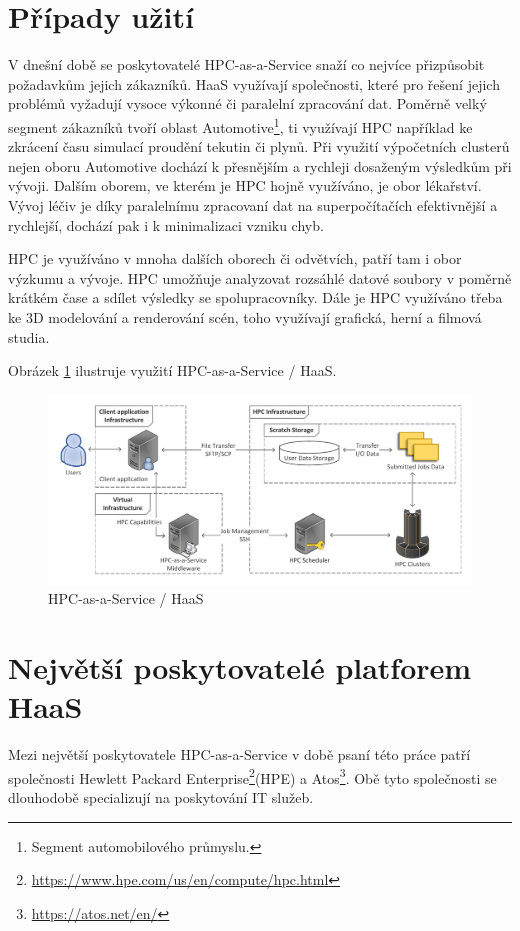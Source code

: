 \section{Případy užití}
V dnešní době se poskytovatelé HPC-as-a-Service snaží co nejvíce přizpůsobit požadavkům jejich zákazníků. HaaS využívají společnosti, které pro řešení jejich problémů vyžadují vysoce výkonné či paralelní zpracování dat. Poměrně velký segment zákazníků tvoří oblast Automotive\footnote{Segment automobilového průmyslu.}, ti využívají HPC například ke zkrácení času simulací proudění tekutin či plynů. Při využití výpočetních clusterů nejen oboru Automotive dochází k přesnějším a rychleji dosaženým výsledkům při vývoji. Dalším oborem, ve kterém je HPC hojně využíváno, je obor lékařství. Vývoj léčiv je díky paralelnímu zpracovaní dat na superpočítačích efektivnější a rychlejší, dochází pak i k minimalizaci vzniku chyb.

HPC je využíváno v mnoha dalších oborech či odvětvích, patří tam i obor výzkumu a vývoje. HPC umožňuje analyzovat rozsáhlé datové soubory v poměrně krátkém čase a sdílet výsledky se spolupracovníky. Dále je HPC využíváno třeba ke 3D modelování a renderování scén, toho využívají grafická, herní a filmová studia.

Obrázek \ref{fig:haas} ilustruje využití HPC-as-a-Service / HaaS.

\begin{figure}[!h]
	\centering
	\includegraphics[width=1\textwidth]{Figures/haas.pdf}
	\caption{HPC-as-a-Service / HaaS \cite{uG7wIvjQiIli6kO9}}
	\label{fig:haas}
\end{figure}

\section{Největší poskytovatelé platforem HaaS}
Mezi největší poskytovatele HPC-as-a-Service v době psaní této práce patří společnosti Hewlett Packard Enterprise\footnote{\href{https://www.hpe.com/us/en/compute/hpc.html}{https://www.hpe.com/us/en/compute/hpc.html}}(HPE) a Atos\footnote{\href{https://atos.net/en/}{https://atos.net/en/}}. Obě tyto společnosti se dlouhodobě specializují na poskytování IT služeb.

